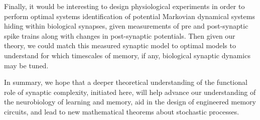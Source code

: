Finally, it would be interesting to design physiological experiments in order to perform optimal systems identification of potential Markovian dynamical systems hiding within biological synapses,
given measurements of pre and post-synaptic spike trains along with changes in post-synaptic potentials.
Then given our theory, we could match this measured synaptic model to optimal models to understand for which timescales of memory, if any, biological synaptic dynamics may be tuned.

In summary, we hope that a deeper theoretical understanding of the functional role of synaptic complexity, initiated here, will help advance our understanding of the neurobiology of learning and memory, aid in the design of engineered memory circuits, and lead to new mathematical theorems about stochastic processes.


\showacknow %
